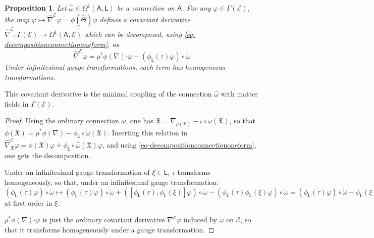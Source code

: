 \documentclass[number]{elsarticle}
\newtheorem{proposition}[theorem]{Proposition}
\theoremstyle{definition}
\theoremstyle{remark}
\numberwithin{equation}{section}
\begin{document}
\begin{proposition}
Let ${\widehat{\omega}} \in \Omega^1({{{{\mathbf{\mathsf{{A}}}}}}}, {{{{\mathbf{\mathsf{{L}}}}}}})$ be a connection on ${{{{\mathbf{\mathsf{{A}}}}}}}$. For any $\varphi \in \Gamma({{{{\mathcal{{E}}}}}})$, the map $\varphi \mapsto {{\widehat{\nabla}}}^{{{{\mathcal{{E}}}}}} \varphi = \phi({{\widehat{\Theta}}})\varphi$ defines a covariant derivative ${{\widehat{\nabla}}}^{{{{\mathcal{{E}}}}}} : \Gamma({{{{\mathcal{{E}}}}}}) \rightarrow \Omega^1({{{{\mathbf{\mathsf{{A}}}}}}}, {{{{\mathcal{{E}}}}}})$ which can be decomposed, using \eqref{eq-decompositionconnectiononeform}, as
\begin{equation}
\label{eq-decompositioncovariantderivative}
{{\widehat{\nabla}}}^{{{{\mathcal{{E}}}}}} \varphi = \rho^\ast\phi(\nabla){\mathord{\cdot}} \varphi - (\phi_{{{{\mathbf{\mathsf{{L}}}}}}} ({\tau}) \varphi) \circ {{\mathring{{\omega}}}}
\end{equation}
Under infinitesimal gauge transformations, each term has homogeneous transformations.
\end{proposition}

This covariant derivative is the minimal coupling of the connection ${\widehat{\omega}}$ with matter fields in $\Gamma({{{{\mathcal{{E}}}}}})$.

\begin{proof}
Using the ordinary connection $\omega$, one has ${{\mathfrak X}} = \nabla_{\rho({{\mathfrak X}})} - \iota \circ \omega({{\mathfrak X}})$, so that $\phi({{\mathfrak X}}) = \rho^\ast \phi(\nabla) - \phi_{{{{\mathbf{\mathsf{{L}}}}}}} \circ \omega({{\mathfrak X}})$. Inserting this relation in ${{\widehat{\nabla}}}^{{{{\mathcal{{E}}}}}}_{{\mathfrak X}} \varphi = \phi({{\mathfrak X}}) \varphi + \phi_{{{{\mathbf{\mathsf{{L}}}}}}} \circ {\widehat{\omega}}({{\mathfrak X}}) \varphi$, and using \eqref{eq-decompositionconnectiononeform}, one gets the decomposition. 

Under an infinitesimal gauge transformation of $\xi \in {{{{\mathbf{\mathsf{{L}}}}}}}$, ${\tau}$ transforms homogeneously, so that, under an infinitesimal gauge transformation: $(\phi_{{{{\mathbf{\mathsf{{L}}}}}}} ({\tau}) \varphi) \circ {{\mathring{{\omega}}}} \mapsto (\phi_{{{{\mathbf{\mathsf{{L}}}}}}} ({\tau}) \varphi) \circ {{\mathring{{\omega}}}} + ([\phi_{{{{\mathbf{\mathsf{{L}}}}}}} ({\tau}), \phi_{{{{\mathbf{\mathsf{{L}}}}}}} (\xi)] \varphi) \circ {{\mathring{{\omega}}}} - (\phi_{{{{\mathbf{\mathsf{{L}}}}}}} ({\tau}) \phi_{{{{\mathbf{\mathsf{{L}}}}}}} (\xi) \varphi) \circ {{\mathring{{\omega}}}} = (\phi_{{{{\mathbf{\mathsf{{L}}}}}}} ({\tau}) \varphi) \circ {{\mathring{{\omega}}}} - \phi_{{{{\mathbf{\mathsf{{L}}}}}}} (\xi) (\phi_{{{{\mathbf{\mathsf{{L}}}}}}} ({\tau}) \varphi) \circ {{\mathring{{\omega}}}}$ at first order in $\xi$.

$\rho^\ast\phi(\nabla){\mathord{\cdot}} \varphi$ is just the ordinary covariant derivative $\nabla^{{{{\mathcal{{E}}}}}} \varphi$ induced by $\omega$ on ${{{{\mathcal{{E}}}}}}$, so that it transforms homogeneously under a gauge transformation.
\end{proof}
\end{document}
